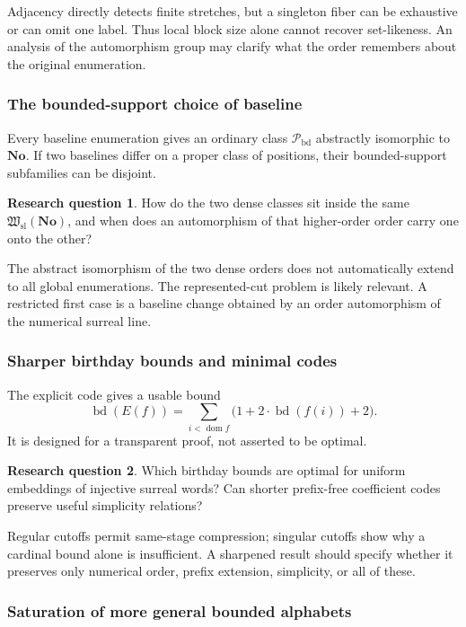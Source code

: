 \documentclass[11pt]{article}
\theoremstyle{definition}
\newtheorem{question}[question]{Research question}
\theoremstyle{remark}
\newcommand{\No}{\mathbf{No}}
\newcommand{\Hsl}{\mathfrak W_{\mathrm{sl}}}
\newcommand{\Pbd}{\mathcal P_{\mathrm{bd}}}
\newcommand{\dom}{\operatorname{dom}}
\newcommand{\bd}{\operatorname{bd}}
\begin{document}
Adjacency directly detects finite stretches, but a
singleton fiber can be exhaustive or can omit one label.
Thus local block size alone cannot recover set-likeness.
An analysis of the automorphism group may clarify what
the order remembers about the original enumeration.

\subsubsection{The bounded-support choice of baseline}

Every baseline enumeration gives an ordinary class
\(\Pbd\) abstractly isomorphic to \(\No\). If two
baselines differ on a proper class of positions, their
bounded-support subfamilies can be disjoint.

\begin{question}\label{swo:n16.5}
How do the two dense classes sit inside the same
\(\Hsl(\No)\), and when does an automorphism of that
higher-order order carry one onto the other?
\end{question}

The abstract isomorphism of the two dense orders does
not automatically extend to all global enumerations.
The represented-cut problem is likely relevant. A
restricted first case is a baseline change obtained by
an order automorphism of the numerical surreal line.

\subsubsection{Sharper birthday bounds and minimal codes}

The explicit code gives a usable bound
\[
 \bd(E(f))=\sum_{i<\dom f}
              \bigl(1+2\cdot\bd(f(i))+2\bigr).
\]
It is designed for a transparent proof, not asserted
to be optimal.

\begin{question}\label{swo:n16.6}
Which birthday bounds are optimal for uniform embeddings
of injective surreal words? Can shorter prefix-free
coefficient codes preserve useful simplicity relations?
\end{question}

Regular cutoffs permit same-stage compression; singular
cutoffs show why a cardinal bound alone is insufficient.
A sharpened result should specify whether it preserves
only numerical order, prefix extension, simplicity, or
all of these.

\subsubsection{Saturation of more general bounded alphabets}
\end{document}
